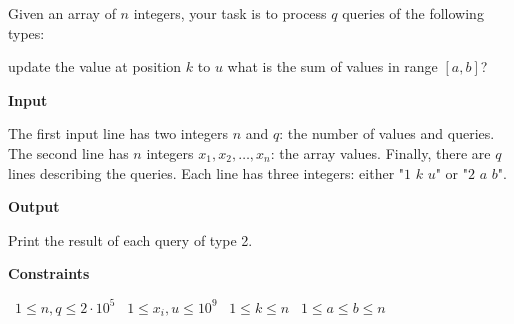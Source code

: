 Given an array of $n$ integers, your task is to process $q$ queries of the following types:

update the value at position $k$ to $u$
what is the sum of values in range $[a,b]$?

\vspace{0.3cm}\noindent\textbf{Input}

The first input line has two integers $n$ and $q$: the number of values and queries.
The second line has $n$ integers $x_1,x_2,\dots,x_n$: the array values.
Finally, there are $q$ lines describing the queries. Each line has three integers: either "$1$ $k$ $u$" or "$2$ $a$ $b$".

\vspace{0.3cm}\noindent\textbf{Output}

Print the result of each query of type 2.

\vspace{0.3cm}\noindent\textbf{Constraints}

\textbullet\ $1 \le n,q \le 2 \cdot 10^5$
\textbullet\ $1 \le x_i, u \le 10^9$
\textbullet\ $1 \le k \le n$
\textbullet\ $1 \le a \le b \le n$